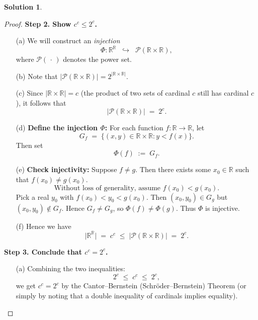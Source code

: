 \documentclass[12pt]{article}
\theoremstyle{definition} %
\newtheorem{solution}{Solution}
\theoremstyle{plain} %
\begin{document}
\begin{solution}
\begin{proof}
                \medskip
                \textbf{Step 2. Show $c^c \le 2^c$.}
                \begin{enumerate}
                    \item[(a)] We will construct an \emph{injection}
                    \[
                       \Phi : \mathbb{R}^{\mathbb{R}} \;\;\hookrightarrow\;\; 
                       \mathcal{P}(\mathbb{R}\times \mathbb{R}),
                    \]
                    where $\mathcal{P}(\,\cdot\,)$ denotes the power set. 
                    \item[(b)] Note that $\bigl|\mathcal{P}(\mathbb{R}\times\mathbb{R})\bigr| = 2^{|\mathbb{R}\times\mathbb{R}|}$. 
                    \item[(c)] Since $|\mathbb{R}\times\mathbb{R}| = c$ (the product of two sets of cardinal $c$ still has cardinal $c$), it follows that 
                    \[
                       \bigl|\mathcal{P}(\mathbb{R}\times\mathbb{R})\bigr|
                       \;=\;
                       2^{c}.
                    \]
                    \item[(d)] \textbf{Define the injection $\Phi$:} For each function $f \colon \mathbb{R} \to \mathbb{R}$, let
                    \[
                       G_f \;=\; \{(x,y) \in \mathbb{R}\times\mathbb{R} : y < f(x)\}.
                    \]
                    Then set 
                    \[
                       \Phi(f) \;:=\; G_f.
                    \]
                    \item[(e)] \textbf{Check injectivity:} Suppose $f \neq g$. Then there exists some $x_0 \in \mathbb{R}$ such that $f(x_0) \neq g(x_0)$. 
                    \[
                      \text{Without loss of generality, assume } f(x_0) < g(x_0).
                    \]
                    Pick a real $y_0$ with $f(x_0) < y_0 < g(x_0)$. Then $(x_0, y_0) \in G_g$ but $(x_0, y_0) \notin G_f$. Hence $G_f \neq G_g$, so $\Phi(f) \neq \Phi(g)$. Thus $\Phi$ is injective.
                    \item[(f)] Hence we have 
                    \[
                       \bigl|\mathbb{R}^{\mathbb{R}}\bigr|
                       \;=\;
                       c^c
                       \;\le\;
                       \bigl|\mathcal{P}(\mathbb{R}\times \mathbb{R})\bigr|
                       \;=\;
                       2^c.
                    \]
                \end{enumerate}
                
                \medskip
                \textbf{Step 3. Conclude that $c^c = 2^c$.}
                \begin{enumerate}
                    \item[(a)] Combining the two inequalities:
                    \[
                       2^c \;\le\; c^c \;\le\; 2^c,
                    \]
                    we get $c^c = 2^c$ by the Cantor--Bernstein (Schröder--Bernstein) Theorem (or simply by noting that a double inequality of cardinals implies equality).
                \end{enumerate}
                

\end{proof}
\end{solution}
\end{document}
